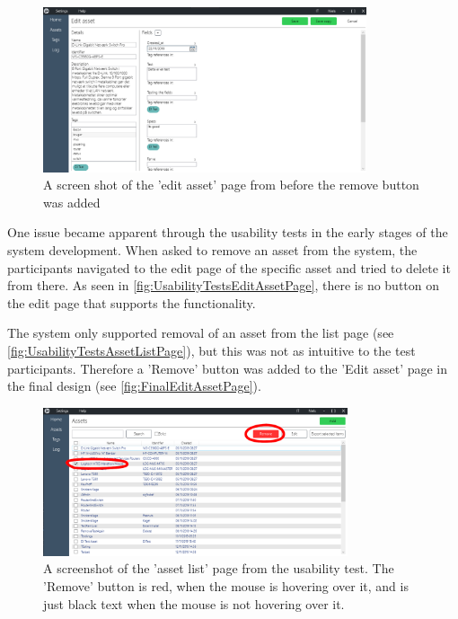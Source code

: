 
\begin{figure}[H]
    \centering
    \includegraphics[width=0.85\textwidth]{figures/PicturesOfTheSystem/Usabilitytest_editAsset.png}
    \caption{A screen shot of the 'edit asset' page from before the remove button was added}
    \label{fig:UsabilityTestsEditAssetPage}
\end{figure}

One issue became apparent through the usability tests in the early stages of the system development. When asked to remove an asset from the system, the participants navigated to the edit page of the specific asset and tried to delete it from there. As seen in \autoref{fig:UsabilityTestsEditAssetPage}, there is no button on the edit page that supports the functionality.
\par
The system only supported removal of an asset from the list page (see \autoref{fig:UsabilityTestsAssetListPage}), but this was not as intuitive to the test participants. Therefore a 'Remove' button was added to the 'Edit asset' page in the final design (see \autoref{fig:FinalEditAssetPage}).

\begin{figure}[H]
    \centering
    \includegraphics[width=0.8\textwidth]{figures/PicturesOfTheSystem/Usabilitytest_AssetList.png}
    \caption{A screenshot of the 'asset list' page from the usability test. The 'Remove' button is red, when the mouse is hovering over it, and is just black text when the mouse is not hovering over it.}
    \label{fig:UsabilityTestsAssetListPage}
\end{figure}

